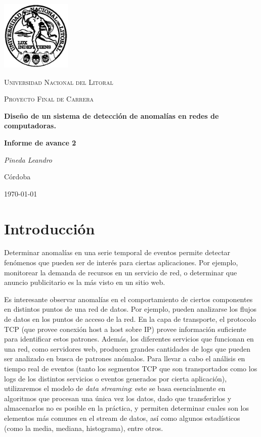 \documentclass[a4paper,10pt, oneside]{article}
\begin{document}
	
\begin{titlepage}
	\centering
	\includegraphics[width=0.25\textwidth]{../../Universidad_del_Litoral}\par\vspace{1cm}
	{\scshape\LARGE Universidad Nacional del Litoral \par}
	\vspace{1cm}
	{\scshape\Large Proyecto Final de Carrera\par}
	\vspace{1.5cm}
	{\huge\bfseries Diseño de un sistema de detección de anomalías en redes de computadoras.\par}
	\vspace{4cm}
	{\huge\bfseries Informe de avance 2\par}
	\vfill
	
	{\Large \itshape Pineda Leandro\par}
	
	
	\large Córdoba\par
	{\large \today\par}	
\end{titlepage}

\modulolinenumbers[5]
\linenumbers

\section{Introducción}
Determinar anomalías en una serie temporal de eventos permite detectar fenómenos que pueden ser de interés para ciertas aplicaciones. Por ejemplo, monitorear la demanda de recursos en un servicio de red, o determinar que anuncio publicitario es la más visto en un sitio web.

Es interesante observar anomalías en el comportamiento de ciertos componentes en distintos puntos de una red de datos. Por ejemplo, pueden analizarse los flujos de datos en los puntos de acceso de la red. En la capa de transporte, el protocolo TCP (que provee conexión host a host sobre IP) provee información suficiente para identificar estos patrones. Además, los diferentes servicios que funcionan en una red, como servidores web, producen grandes cantidades de logs que pueden ser analizado en busca de patrones anómalos.
Para llevar a cabo el análisis en tiempo real de eventos (tanto los segmentos TCP que son transportados como los logs de los distintos servicios o eventos generados por cierta aplicación), utilizaremos el modelo de \textit{data streaming}: este se basa esencialmente en algoritmos que procesan una única vez los datos, dado que transferirlos y almacenarlos no es posible en la práctica, y permiten determinar cuales son los elementos más comunes en el stream de datos, así como algunos estadísticos (como la media, mediana, histograma), entre otros.
\end{document}
